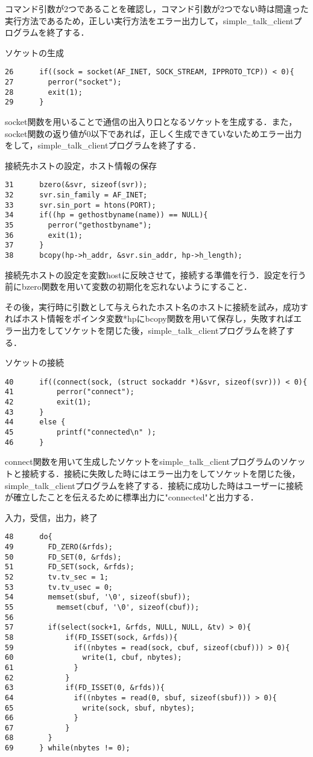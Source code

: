 \documentclass[a4j]{jarticle}
\newenvironment{bit}{\begin{breakitembox}}{\end{breakitembox}} %
\newcommand{\stc}{simple\_talk\_clientプログラム}
\begin{document}
コマンド引数が2つであることを確認し，コマンド引数が2つでない時は間違った実行方法であるため，正しい実行方法をエラー出力して，\stc を終了する．

\begin{bit}[l]{ソケットの生成}
\begin{verbatim}
26		if((sock = socket(AF_INET, SOCK_STREAM, IPPROTO_TCP)) < 0){
27		  perror("socket");
28		  exit(1);
29		}
\end{verbatim}
\end{bit}

socket関数を用いることで通信の出入り口となるソケットを生成する．また，socket関数の返り値が0以下であれば，正しく生成できていないためエラー出力をして，\stc を終了する．

\begin{bit}[l]{接続先ホストの設定，ホスト情報の保存}
\begin{verbatim}
31		bzero(&svr, sizeof(svr));
32		svr.sin_family = AF_INET;
33		svr.sin_port = htons(PORT);
34		if((hp = gethostbyname(name)) == NULL){
35		  perror("gethostbyname");
36		  exit(1);
37		}
38		bcopy(hp->h_addr, &svr.sin_addr, hp->h_length);
\end{verbatim}
\end{bit}

接続先ホストの設定を変数hostに反映させて，接続する準備を行う．設定を行う前にbzero関数を用いて変数の初期化を忘れないようにすること．

その後，実行時に引数として与えられたホスト名のホストに接続を試み，成功すればホスト情報をポインタ変数*hpにbcopy関数を用いて保存し，失敗すればエラー出力をしてソケットを閉じた後，\stc を終了する．

\begin{bit}[l]{ソケットの接続}
\begin{verbatim}
40		if((connect(sock, (struct sockaddr *)&svr, sizeof(svr))) < 0){
41		    perror("connect");
42		    exit(1);
43		}
44		else {
45			printf("connected\n" );
46		}
\end{verbatim}
\end{bit}

connect関数を用いて生成したソケットを\stc のソケットと接続する．接続に失敗した時にはエラー出力をしてソケットを閉じた後，\stc を終了する．接続に成功した時はユーザーに接続が確立したことを伝えるために標準出力に"connected"と出力する．

\begin{bit}[l]{入力，受信，出力，終了}
\begin{verbatim}
48		do{
49		  FD_ZERO(&rfds);
50		  FD_SET(0, &rfds);
51		  FD_SET(sock, &rfds);
52		  tv.tv_sec = 1;
53		  tv.tv_usec = 0;
54		  memset(sbuf, '\0', sizeof(sbuf));
55			memset(cbuf, '\0', sizeof(cbuf));
56
57		  if(select(sock+1, &rfds, NULL, NULL, &tv) > 0){
58			  if(FD_ISSET(sock, &rfds)){
59			    if((nbytes = read(sock, cbuf, sizeof(cbuf))) > 0){
60			      write(1, cbuf, nbytes);
61			    }
62			  }
63			  if(FD_ISSET(0, &rfds)){
64			    if((nbytes = read(0, sbuf, sizeof(sbuf))) > 0){
65			      write(sock, sbuf, nbytes);
66			    }
67			  }
68		  }
69		} while(nbytes != 0);
\end{verbatim}
\end{bit}
\end{document}
